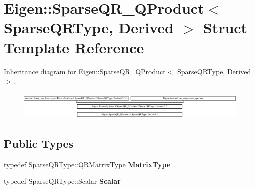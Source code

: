 \hypertarget{struct_eigen_1_1_sparse_q_r___q_product}{}\section{Eigen\+::Sparse\+Q\+R\+\_\+\+Q\+Product$<$ Sparse\+Q\+R\+Type, Derived $>$ Struct Template Reference}
\label{struct_eigen_1_1_sparse_q_r___q_product}
Inheritance diagram for Eigen\+::Sparse\+Q\+R\+\_\+\+Q\+Product$<$ Sparse\+Q\+R\+Type, Derived $>$\+:\begin{figure}[H]
\begin{center}
\leavevmode
\includegraphics[height=1.383855cm]{struct_eigen_1_1_sparse_q_r___q_product}
\end{center}
\end{figure}
\subsection*{Public Types}
\begin{DoxyCompactItemize}
\item 
\mbox{\label{struct_eigen_1_1_sparse_q_r___q_product_a849ced092fb297e3d6fa4907a341d6cb}} 
typedef Sparse\+Q\+R\+Type\+::\+Q\+R\+Matrix\+Type {\bfseries Matrix\+Type}
\item 
\mbox{\label{struct_eigen_1_1_sparse_q_r___q_product_ad87b00aa80804c14b5a8bbed340b7e08}} 
typedef Sparse\+Q\+R\+Type\+::\+Scalar {\bfseries Scalar}
\end{DoxyCompactItemize}
